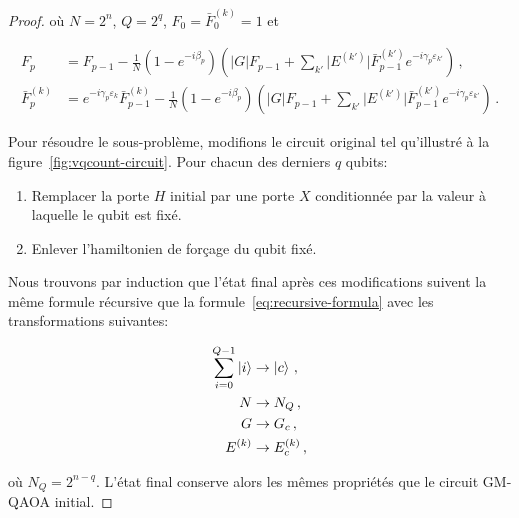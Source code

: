 \begin{proof}
où $N=2^{n}$, $Q=2^{q}$, $F_{0}=\bar{F}_{0}^{(k)}=1$ et

\begin{align}
    F_{p} &= F_{p-1} - \frac{1}{N} (1-e^{-i\beta_{p}}) \left( \lvert G \rvert   F_{p-1} + \sum_{k'} \lvert E^{(k')} \rvert \bar{F}^{(k')}_{p-1} e^{-i\gamma_{p}\varepsilon_{k'}} \right) \,, \\
    \bar{F}^{(k)}_{p} &= e^{-i\gamma_{p} \varepsilon_{k}}\bar{F}_{p-1}^{(k)} - \frac{1}{N} (1-e^{-i\beta_{p}}) \left( \lvert G \rvert   F_{p-1} + \sum_{k'} \lvert E^{(k')} \rvert \bar{F}^{(k')}_{p-1} e^{-i\gamma_{p}\varepsilon_{k'}} \right) \,.
\end{align}

Pour résoudre le sous-problème, modifions le circuit original tel qu'illustré à la figure~\ref{fig:vqcount-circuit}. Pour chacun des derniers $q$ qubits:

\begin{enumerate}
    \item Remplacer la porte $H$ initial par une porte $X$ conditionnée par la valeur à laquelle le qubit est fixé.
    \item Enlever l'hamiltonien de forçage du qubit fixé.
\end{enumerate}

Nous trouvons par induction que l'état final après ces modifications suivent la même formule récursive que la formule~\ref{eq:recursive-formula} avec les transformations suivantes:

\begin{align*}
    \sum_{i=0}^{Q-1} \ket{i} &\to \ket{c} \,, \\
    N &\to N_{Q} \,, \\
    G &\to G_{c} \,, \\
    E^{(k)} &\to E^{(k)}_{c} \,,
\end{align*}

où $N_{Q} = 2^{n-q}$. L'état final conserve alors les mêmes propriétés que le circuit GM-QAOA initial.
\end{proof}

